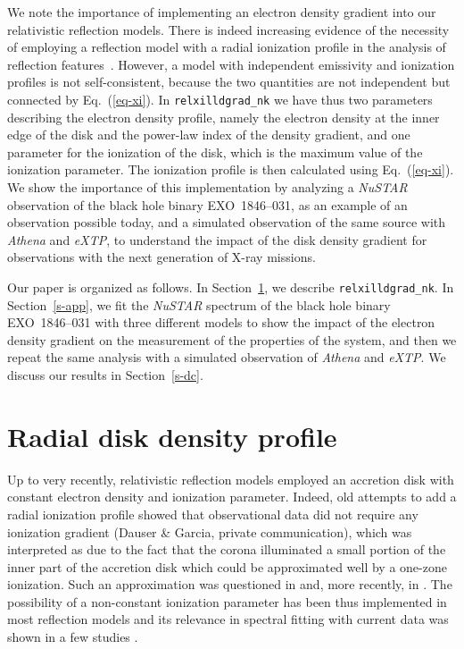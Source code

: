 \documentclass[twocolumn]{emulateapj}
\begin{document}
We note the importance of implementing an electron density gradient into our relativistic reflection models. There is indeed increasing evidence of the necessity of employing a reflection model with a radial ionization profile in the analysis of reflection features~\citep[see, e.g.,][]{2012A&A...545A.106S,2019MNRAS.485..239K,2020MNRAS.492..405S,2021PhRvD.103j3023A}. However, a model with independent emissivity and ionization profiles is not self-consistent, because the two quantities are not independent but connected by Eq.~(\ref{eq-xi}). In {\tt relxilldgrad\_nk} we have thus two parameters describing the electron density profile, namely the electron density at the inner edge of the disk and the power-law index of the density gradient, and one parameter for the ionization of the disk, which is the maximum value of the ionization parameter. The ionization profile is then calculated using Eq.~(\ref{eq-xi}). We show the importance of this implementation by analyzing a \textsl{NuSTAR} observation of the black hole binary EXO~1846--031, as an example of an observation possible today, and a simulated observation of the same source with \textsl{Athena} and \textsl{eXTP}, to understand the impact of the disk density gradient for observations with the next generation of X-ray missions.


Our paper is organized as follows. In Section~\ref{s-disk}, we describe {\tt relxilldgrad\_nk}. In Section~\ref{s-app}, we fit the \textsl{NuSTAR} spectrum of the black hole binary EXO~1846--031 with three different models to show the impact of the electron density gradient on the measurement of the properties of the system, and then we repeat the same analysis with a simulated observation of \textsl{Athena} and \textsl{eXTP}. We discuss our results in Section~\ref{s-dc}.










\section{Radial disk density profile} \label{s-disk}

Up to very recently, relativistic reflection models employed an accretion disk with constant electron density and ionization parameter. Indeed, old attempts to add a radial ionization profile showed that observational data did not require any ionization gradient (Dauser \& Garcia, private communication), which was interpreted as due to the fact that the corona illuminated a small portion of the inner part of the accretion disk which could be approximated well by a one-zone ionization. Such an approximation was questioned in \citet{2012A&A...545A.106S} and, more recently, in \citet{2019MNRAS.485..239K}. The possibility of a non-constant ionization parameter has been thus implemented in most reflection models and its relevance in spectral fitting with current data was shown in a few studies \citep[see, e.g.,][]{2020MNRAS.492..405S,2021PhRvD.103j3023A}. 
\end{document}
